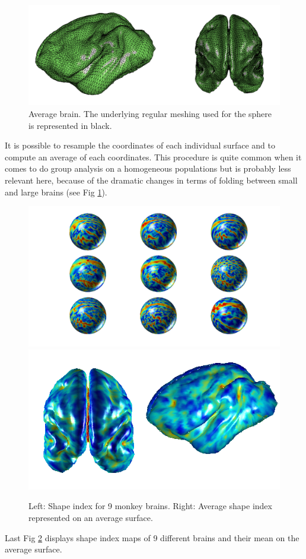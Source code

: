 \documentclass[a4paper, oneside, 12pt, onecolumn]{article}
\begin{document}
\begin{figure}
\center
\includegraphics[width=0.6\linewidth]{Figs/mean_shape.png}
\caption{Average brain. The underlying regular meshing used for the sphere is represented in black.}
\label{Fig4}
\end{figure}

It is possible to resample the coordinates of each individual surface and to compute an average of each coordinates. This procedure is quite common when it comes to do group analysis on a homogeneous populations but is probably less relevant here, because of the dramatic changes in terms of folding between small and large brains (see Fig \ref{Fig4}).\\

\begin{figure}
\center
\includegraphics[width=0.45\linewidth]{Figs/all_both_SI.png}
\includegraphics[width=0.5\linewidth]{Figs/mean_SI.png}
\caption{Left: Shape index for 9 monkey brains. Right: Average shape index represented on an average surface.}
\label{Fig5}
\end{figure}

Last Fig \ref{Fig5} displays shape index maps of 9 different brains and their mean on the average surface.



\end{document}
